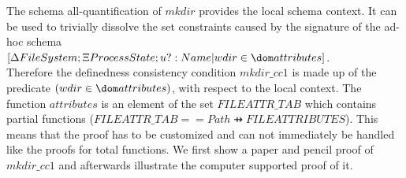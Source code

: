 
The schema all-quantification of $mkdir$ provides the local schema context. It can be used to trivially dissolve the set constraints caused by the signature of the ad-hoc schema\\[0.3cm]
$[ \Delta FileSystem; \Xi ProcessState; u? : Name | wdir \in \dom attributes ]$.\\[0.3cm]
Therefore the definedness consistency condition $mkdir\_cc1$ is made up of the
predicate $(wdir \in \dom attributes)$, with respect to the local context. The
function $attributes$ is an element of the set $FILEATTR\_TAB$ which contains
partial functions ($FILEATTR\_TAB == Path \pfun FILEATTRIBUTES$). This means
that the proof has to be customized and can not immediately be handled like the
proofs for total functions. We first show a paper and pencil proof of
$mkdir\_cc1$ and afterwards illustrate the computer supported proof of it.


